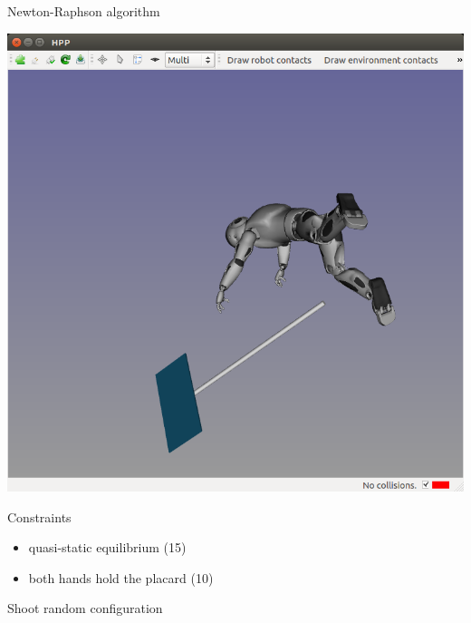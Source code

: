 \begin {frame} {Newton-Raphson algorithm}
  \parbox {.5\linewidth} {
    \centerline {
      \includegraphics [width=\linewidth] {figures/seq/romeo-0.png}
    }
  }
  \hspace*{.05\linewidth}
  \parbox {.39\linewidth} {
    Constraints
    \begin {itemize}
    \item quasi-static equilibrium (15)
    \item both hands hold the placard (10)
    \end{itemize}
  }
  \centerline {
    Shoot random configuration
  }
\end {frame}

